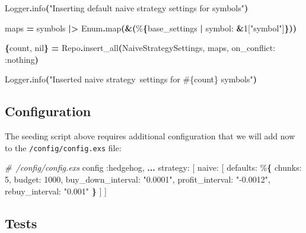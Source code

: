 \documentclass[
  oneside]{book}
\newenvironment{Shaded}{\begin{snugshade}}{\end{snugshade}}
\newcommand{\CommentTok}[1]{\textcolor[rgb]{0.56,0.35,0.01}{\textit{#1}}}
\newcommand{\ConstantTok}[1]{\textcolor[rgb]{0.56,0.35,0.01}{#1}}
\newcommand{\DecValTok}[1]{\textcolor[rgb]{0.00,0.00,0.81}{#1}}
\newcommand{\FunctionTok}[1]{\textcolor[rgb]{0.13,0.29,0.53}{\textbf{#1}}}
\newcommand{\NormalTok}[1]{#1}
\newcommand{\OperatorTok}[1]{\textcolor[rgb]{0.81,0.36,0.00}{\textbf{#1}}}
\newcommand{\OtherTok}[1]{\textcolor[rgb]{0.56,0.35,0.01}{#1}}
\newcommand{\StringTok}[1]{\textcolor[rgb]{0.31,0.60,0.02}{#1}}
\newcommand{\VariableTok}[1]{\textcolor[rgb]{0.00,0.00,0.00}{#1}}
\begin{document}
\begin{Shaded}
\begin{Highlighting}[]
\ConstantTok{Logger}\OperatorTok{.}\NormalTok{info}\FunctionTok{(}\StringTok{"Inserting default naive strategy settings for symbols"}\FunctionTok{)}

\NormalTok{maps }\OperatorTok{=}\NormalTok{ symbols}
  \OperatorTok{|\textgreater{}} \ConstantTok{Enum}\OperatorTok{.}\NormalTok{map}\FunctionTok{(}\OperatorTok{\&}\FunctionTok{(}\NormalTok{\%}\FunctionTok{\{}\NormalTok{base\_settings }\OperatorTok{|} \VariableTok{symbol:} \OperatorTok{\&}\DecValTok{1}\OtherTok{[}\StringTok{"symbol"}\OtherTok{]}\FunctionTok{\}))}

\FunctionTok{\{}\NormalTok{count, }\ConstantTok{nil}\FunctionTok{\}} \OperatorTok{=} \ConstantTok{Repo}\OperatorTok{.}\NormalTok{insert\_all}\FunctionTok{(}\ConstantTok{NaiveStrategySettings}\NormalTok{, maps, }\VariableTok{on\_conflict:} \VariableTok{:nothing}\FunctionTok{)}

\ConstantTok{Logger}\OperatorTok{.}\NormalTok{info}\FunctionTok{(}\StringTok{"Inserted naive strategy settings for }\OtherTok{\#\{}\NormalTok{count}\OtherTok{\}}\StringTok{ symbols"}\FunctionTok{)}
\end{Highlighting}
\end{Shaded}

\subsection{Configuration}\label{configuration}

The seeding script above requires additional configuration that we will add now to the \texttt{/config/config.exs} file:

\begin{Shaded}
\begin{Highlighting}[]
\CommentTok{\# /config/config.exs}
\NormalTok{config }\VariableTok{:hedgehog}\NormalTok{,}
  \OperatorTok{...}
  \VariableTok{strategy:} \OtherTok{[}
    \VariableTok{naive:} \OtherTok{[}
      \VariableTok{defaults:}\NormalTok{ \%}\FunctionTok{\{}
        \VariableTok{chunks:} \DecValTok{5}\NormalTok{,}
        \VariableTok{budget:} \DecValTok{1000}\NormalTok{,}
        \VariableTok{buy\_down\_interval:} \StringTok{"0.0001"}\NormalTok{,}
        \VariableTok{profit\_interval:} \StringTok{"{-}0.0012"}\NormalTok{,}
        \VariableTok{rebuy\_interval:} \StringTok{"0.001"}
      \FunctionTok{\}}
    \OtherTok{]}
  \OtherTok{]}
\end{Highlighting}
\end{Shaded}

\subsection{Tests}\label{tests}
\end{document}

